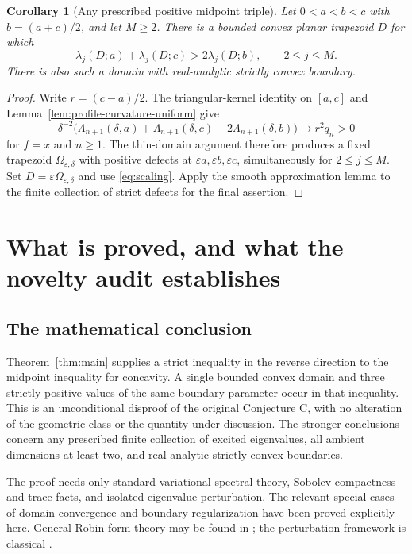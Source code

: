 \documentclass[11pt,a4paper]{article}
\newtheorem{corollary}[theorem]{Corollary}
\theoremstyle{definition}\newtheorem{definition}[theorem]{Definition}
\theoremstyle{remark}\newtheorem{remark}[theorem]{Remark}
\begin{document}
\begin{corollary}[Any prescribed positive midpoint triple]
\label{cor:prescribed-parameters}
Let $0<a<b<c$ with $b=(a+c)/2$, and let $M\geq2$.
There is a bounded convex planar trapezoid $D$ for which
\[
 \lambda_j(D;a)+\lambda_j(D;c)>2\lambda_j(D;b),
 \qquad 2\leq j\leq M.
\]
There is also such a domain with real-analytic strictly convex
boundary.
\end{corollary}
\begin{proof}
Write $r=(c-a)/2$. The triangular-kernel identity on $[a,c]$
and Lemma~\ref{lem:profile-curvature-uniform} give
\[
 \delta^{-2}
 \bigl(\Lambda_{n+1}(\delta,a)+\Lambda_{n+1}(\delta,c)
                   -2\Lambda_{n+1}(\delta,b)\bigr)
 \longrightarrow r^2q_n>0
\]
for $f=x$ and $n\geq1$. The thin-domain argument therefore
produces a fixed trapezoid $\Omega_{\varepsilon,\delta}$ with
positive defects at $\varepsilon a,\varepsilon b,\varepsilon c$,
simultaneously for $2\leq j\leq M$. Set
$D=\varepsilon\Omega_{\varepsilon,\delta}$ and use
\eqref{eq:scaling}. Apply the smooth approximation lemma to the
finite collection of strict defects for the final assertion.
\end{proof}
\section{What is proved, and what the novelty audit establishes}
\label{sec:status}

\subsection{The mathematical conclusion}
Theorem~\ref{thm:main} supplies a strict inequality in the reverse
direction to the midpoint inequality for concavity. A single
bounded convex domain and three strictly positive values of the
same boundary parameter occur in that inequality. This is an
unconditional disproof of the original Conjecture C, with no
alteration of the geometric class or the quantity under discussion.
The stronger conclusions concern any prescribed finite collection
of excited eigenvalues, all ambient dimensions at least two,
and real-analytic strictly convex boundaries.

The proof needs only standard variational spectral theory,
Sobolev compactness and trace facts, and isolated-eigenvalue
perturbation. The relevant special cases of domain convergence
and boundary regularization have been proved explicitly here.
General Robin form theory may be found in \cite{Daners2000};
the perturbation framework is classical \cite{Kato}.
\end{document}
